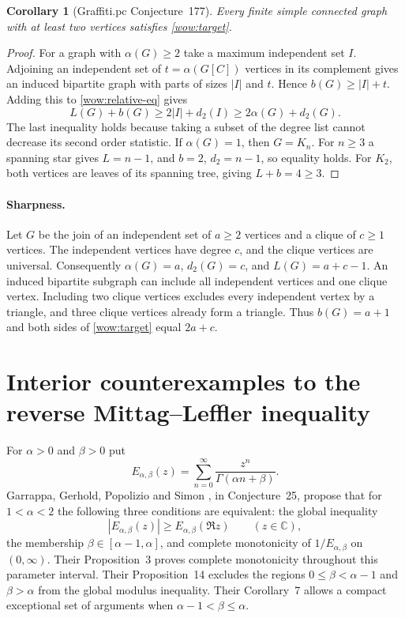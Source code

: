 \documentclass[11pt,a4paper]{article}
\newtheorem{corollary}[theorem]{Corollary}
\theoremstyle{definition}
\theoremstyle{remark}
\numberwithin{equation}{section}
\begin{document}
\begin{corollary}[Graffiti.pc Conjecture~177]\label{wow:main}
Every finite simple connected graph with at least two vertices
satisfies \eqref{wow:target}.
\end{corollary}
\begin{proof}
For a graph with $\alpha(G)\ge2$ take a maximum independent set $I$.
Adjoining an independent set of $t=\alpha(G[C])$ vertices in its
complement gives an induced bipartite graph with parts of sizes
$|I|$ and $t$. Hence $b(G)\ge |I|+t$. Adding this to
\eqref{wow:relative-eq} gives
\[
 L(G)+b(G)\ge 2|I|+d_2(I)\ge 2\alpha(G)+d_2(G).
\]
The last inequality holds because taking a subset of the degree list
cannot decrease its second order statistic. If $\alpha(G)=1$, then
$G=K_n$. For $n\ge3$ a spanning star gives $L=n-1$, and
$b=2$, $d_2=n-1$, so equality holds. For $K_2$, both vertices are
leaves of its spanning tree, giving $L+b=4\ge3$.
\end{proof}

\paragraph{Sharpness.}
Let $G$ be the join of an independent set of $a\ge2$ vertices and a
clique of $c\ge1$ vertices. The independent vertices have degree $c$,
and the clique vertices are universal. Consequently
$\alpha(G)=a$, $d_2(G)=c$, and $L(G)=a+c-1$. An induced bipartite
subgraph can include all independent vertices and one clique vertex.
Including two clique vertices excludes every independent vertex by a
triangle, and three clique vertices already form a triangle. Thus
$b(G)=a+1$ and both sides of \eqref{wow:target} equal $2a+c$.


\section{Interior counterexamples to the reverse Mittag--Leffler inequality}
\label{ggps:section}

For $\alpha>0$ and $\beta>0$ put
\[
 E_{\alpha,\beta}(z)=\sum_{n=0}^{\infty}
                 \frac{z^n}{\Gamma(\alpha n+\beta)}.
\]
Garrappa, Gerhold, Popolizio and Simon \cite{GGPS2025}, in Conjecture~25, propose that for $1<\alpha<2$ the following three
conditions are equivalent: the global inequality
\begin{equation}\label{ggps:original}
 |E_{\alpha,\beta}(z)|\ge E_{\alpha,\beta}(\Re z)\qquad(z\in\mathbb C),
\end{equation}
the membership $\beta\in[\alpha-1,\alpha]$, and complete monotonicity
of $1/E_{\alpha,\beta}$ on $(0,\infty)$. Their Proposition~3 proves
complete monotonicity throughout this parameter interval. Their
Proposition~14 excludes the regions $0\le\beta<\alpha-1$ and
$\beta>\alpha$ from the global modulus inequality. Their Corollary~7
allows a compact exceptional set of arguments when
$\alpha-1<\beta\le\alpha$.
\end{document}
